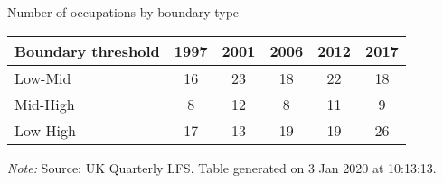 \begin{center}
\begin{threeparttable}[!h]
\caption{Number of occupations by boundary type}
\label{tab:shareBound}
\begin{tabular}{lccccc}
\toprule
\toprule
\textbf{Boundary threshold}&\multicolumn{1}{c}{\textbf{1997}}&\multicolumn{1}{c}{\textbf{2001}}&\multicolumn{1}{c}{\textbf{2006}}&\multicolumn{1}{c}{\textbf{2012}}&\multicolumn{1}{c}{\textbf{2017}} \\
\midrule
Low-Mid     &          16&          23&          18&          22&          18\\
Mid-High    &           8&          12&           8&          11&           9\\
Low-High    &          17&          13&          19&          19&          26\\
\bottomrule
\bottomrule
\end{tabular}
\begin{tablenotes}
\item\footnotesize\textit{Note:} Source: UK Quarterly LFS. Table generated on  3 Jan 2020 at 10:13:13.
\end{tablenotes}
\end{threeparttable}
\end{center}
